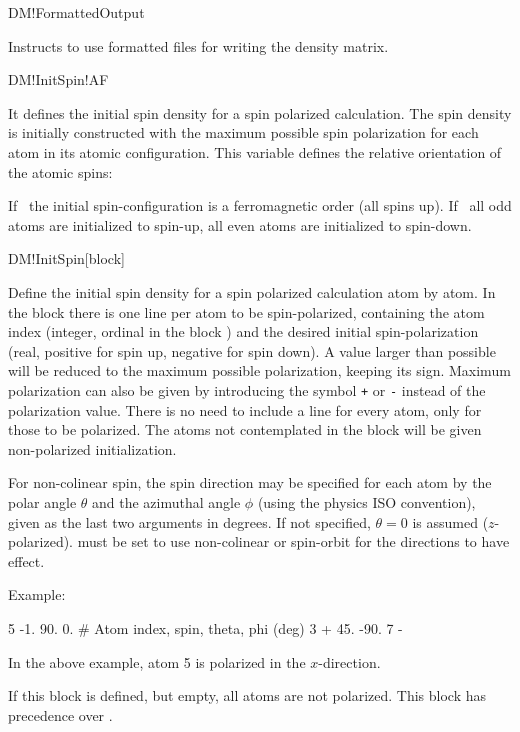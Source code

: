 \begin{fdflogicalF}{DM!FormattedOutput}

  Instructs to use formatted files for writing the density
  matrix.
  
\end{fdflogicalF}

\begin{fdflogicalF}{DM!InitSpin!AF}
  
  It defines the initial spin density for a spin polarized calculation.
  The spin density is initially constructed with the maximum possible
  spin polarization for each atom in its atomic configuration.
  This variable defines the relative orientation of the atomic
  spins:

  If \fdffalse\ the initial spin-configuration is a ferromagnetic
  order (all spins up).
  If \fdftrue\ all odd atoms are initialized to spin-up, all even
  atoms are initialized to spin-down.

\end{fdflogicalF}

\begin{fdfentry}{DM!InitSpin}[block]
  
  Define the initial spin density for a spin polarized calculation
  atom by atom. In the block there is one line per atom to be
  spin-polarized, containing the atom index (integer, ordinal in the
  block ) and the desired
  initial spin-polarization (real, positive for spin up, negative for
  spin down). A value larger than possible will be reduced to the
  maximum possible polarization, keeping its sign. Maximum
  polarization can also be given by introducing the symbol \texttt{+}
  or \texttt{-} instead of the polarization value. There is no need
  to include a line for every atom, only for those to be
  polarized. The atoms not contemplated in the block will be given
  non-polarized initialization. 

  For non-colinear spin, the spin direction may be specified for each
  atom by the polar angle $\theta$ and the azimuthal angle $\phi$
  (using the physics ISO convention), given as the last two arguments
  in degrees. If not specified, $\theta=0$ is assumed
  ($z$-polarized).  must be set to use non-colinear or
  spin-orbit for the directions to have effect.

  Example:
  \begin{fdfexample}
        5  -1.   90.   0.   # Atom index, spin, theta, phi (deg)
        3   +    45. -90.
        7   -
  \end{fdfexample}
  In the above example, atom 5 is polarized in the $x$-direction.

  If this block is defined, but empty, all atoms are not polarized.
  This block has precedence over .

\end{fdfentry}

